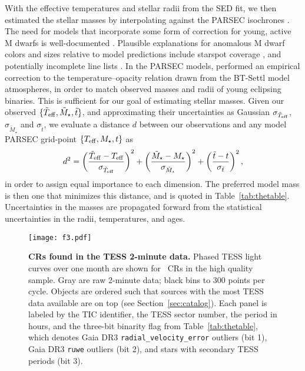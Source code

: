 \documentclass[11pt,twocolumn,tighten]{aastex63}
\begin{document}
With the effective temperatures and stellar radii from the SED fit, we
then estimated the stellar masses by interpolating against the PARSEC
isochrones \citep[v1.2S][]{2014MNRAS.444.2525C}.  The need for models
that incorporate some form of correction for young, active M dwarfs is
well-documented
\citep[e.g.][]{2012ApJ...756...47S,2015ApJ...804..146D,2016A&A...593A..99F,2020ApJ...891...29S}.
Plausible explanations for anomalous M dwarf colors and sizes relative
to model predictions include starspot coverage
\citep[e.g.][]{2017ApJ...836..200G}, and potentially incomplete line
lists \citep[e.g.][]{2013A&A...556A..15R}.  In the PARSEC models,
\citet{2014MNRAS.444.2525C} performed an empirical correction to the
temperature--opacity relation drawn from the BT-Settl model
atmospheres, in order to match observed masses and radii of young
eclipsing binaries.  This is sufficient for our goal of estimating
stellar masses.  Given our observed $\{ \tilde{T}_{\rm eff},
\tilde{M}_\star, \tilde{t} \}$, and approximating their uncertainties
as Gaussian $\sigma_{\tilde{T}_{\rm eff}}$, $\sigma_{\tilde{M}_\star}$
and $\sigma_{\tilde{t}}$, we evaluate a distance $d$ between our
observations and any model PARSEC grid-point $\{ T_{\rm eff}, M_\star,
t \}$ as
\begin{equation}
  d^2 = 
  \left( \frac{\tilde{T}_{\rm eff} - T_{\rm eff}}{\sigma_{\tilde{T}_{\rm eff}}} \right)^2
  +
  \left( \frac{\tilde{M}_{\star} - M_{\star}}{\sigma_{\tilde{M}_{\star}}} \right)^2
  +
  \left( \frac{\tilde{t} - t}{\sigma_{\tilde{t}}} \right)^2,
\end{equation}
in order to assign equal importance to each dimension.  The preferred
model mass is then one that minimizes this distance, and is quoted in
Table~\ref{tab:thetable}.  Uncertainties in the masses are propagated
forward from the statistical uncertainties in the radii, temperatures,
and ages.



\begin{figure*}[!tp]
	\begin{center}
		\centering
		\texttt{[image: f3.pdf]}
    \vspace{-0.3cm}
		\caption{
      {\bf CRs found in the TESS 2-minute data.}
      Phased TESS light curves over one month are shown for \ngoods\
      CRs in the high quality sample.  Gray are raw 2-minute data;
      black bins to 300 points per cycle.  Objects are ordered such
      that sources with the most TESS data available are on top (see
      Section~\ref{sec:catalog}).  
      Each panel is labeled by
      the TIC identifier, the TESS sector number, the period in
      hours, and the three-bit binarity flag from Table~\ref{tab:thetable},
      which denotes Gaia DR3 \texttt{radial\_velocity\_error} outliers
      (bit 1), Gaia DR3 \texttt{ruwe} outliers (bit 2), and stars with
      secondary TESS periods (bit 3). 
		}
		\label{fig:cqvs}
	\end{center}
\end{figure*}
\end{document}
